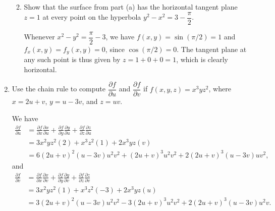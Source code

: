\documentclass[12pt]{article}
\newcommand{\points}[1]{\marginpar{\hspace{24pt}[#1]}}
\begin{document}
\begin{enumerate}
\begin{enumerate}
\bigskip

\bigskip



\item Show that the surface from part (a) has the horizontal tangent plane $z=1$ at every point on the hyperbola $y^2-x^2 = 3-\dfrac{\pi}{2}$. \points{2}

\bigskip

Whenever $x^2-y^2 = \dfrac{\pi}{2}-3$, we have $f(x,y) = \sin(\pi/2) = 1$ and $f_x(x,y)=f_y(x,y) = 0$, since $\cos(\pi/2)=0$. The tangent plane at any such point is thus given by $z=1+0+0=1$, which is clearly horizontal.
\end{enumerate} 


\bigskip

\bigskip

\item Use the chain rule to compute $\dfrac{\partial f}{\partial u}$ and $\dfrac{\partial f}{\partial v}$ if $f(x,y,z) = x^3yz^2$, where $x = 2u+v$, $y=u-3v$, and $z=uv$. \points{5}

\bigskip

We have
\begin{align*}
 \frac{\partial f}{\partial u} & = \frac{\partial f}{\partial x}\frac{\partial x}{\partial u} + \frac{\partial f}{\partial y}\frac{\partial y}{\partial u} + \frac{\partial f}{\partial z}\frac{\partial z}{\partial u}\\
& = 3x^2yz^2(2)+x^3z^2(1)+2x^3yz(v)\\
& = 6(2u+v)^2(u-3v)u^2v^2+(2u+v)^3u^2v^2+2(2u+v)^3(u-3v)uv^2,
\end{align*}
and
\begin{align*}
 \frac{\partial f}{\partial v} & = \frac{\partial f}{\partial x}\frac{\partial x}{\partial v} + \frac{\partial f}{\partial y}\frac{\partial y}{\partial v} + \frac{\partial f}{\partial z}\frac{\partial z}{\partial v}\\
& = 3x^2yz^2(1)+x^3z^2(-3)+2x^3yz(u)\\
& = 3(2u+v)^2(u-3v)u^2v^2-3(2u+v)^3u^2v^2+2(2u+v)^3(u-3v)u^2v.
\end{align*}



\end{enumerate}
\end{document}
